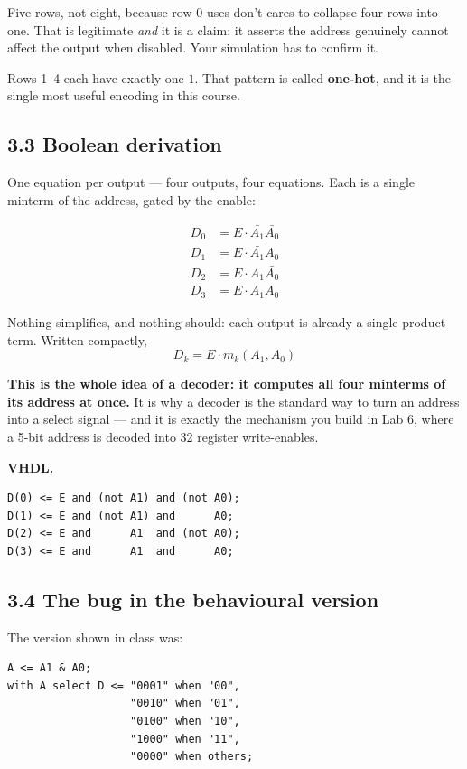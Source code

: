 \documentclass[11pt]{article}
\begin{document}
Five rows, not eight, because row 0 uses don't-cares to collapse four rows into one.
That is legitimate \emph{and} it is a claim: it asserts the address genuinely cannot
affect the output when disabled. Your simulation has to confirm it.

Rows 1--4 each have exactly one $1$. That pattern is called \textbf{one-hot}, and it
is the single most useful encoding in this course.

\subsection*{3.3 Boolean derivation}

One equation per output --- four outputs, four equations. Each is a single minterm
of the address, gated by the enable:

\begin{align*}
D_0 &= E \cdot \bar{A_1}\bar{A_0} \\
D_1 &= E \cdot \bar{A_1}A_0 \\
D_2 &= E \cdot A_1\bar{A_0} \\
D_3 &= E \cdot A_1A_0
\end{align*}

Nothing simplifies, and nothing should: each output is already a single product
term. Written compactly,
\[
D_k = E \cdot m_k(A_1, A_0)
\]

\textbf{This is the whole idea of a decoder: it computes all four minterms of its
address at once.} It is why a decoder is the standard way to turn an address into a
select signal --- and it is exactly the mechanism you build in Lab 6, where a 5-bit
address is decoded into 32 register write-enables.

\textbf{VHDL.}
\begin{lstlisting}
D(0) <= E and (not A1) and (not A0);
D(1) <= E and (not A1) and      A0;
D(2) <= E and      A1  and (not A0);
D(3) <= E and      A1  and      A0;
\end{lstlisting}

\subsection*{3.4 The bug in the behavioural version}

The version shown in class was:

\begin{lstlisting}
A <= A1 & A0;
with A select D <= "0001" when "00",
                   "0010" when "01",
                   "0100" when "10",
                   "1000" when "11",
                   "0000" when others;
\end{lstlisting}
\end{document}
